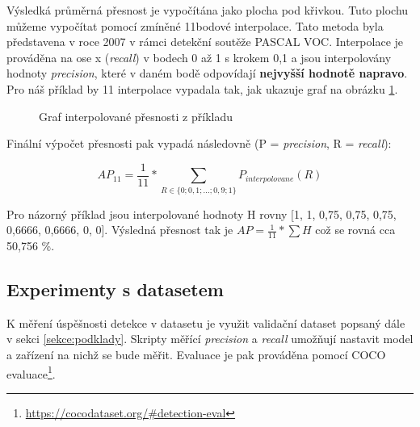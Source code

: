 Výsledká průměrná přesnost je vypočítána jako plocha pod křivkou. Tuto plochu můžeme vypočítat pomocí zmíněné 11bodové interpolace. Tato metoda byla představena v roce 2007 v rámci detekční soutěže PASCAL VOC. Interpolace je prováděna na ose x (\emph{recall}) v bodech 0 až 1 s krokem 0,1 a jsou interpolovány hodnoty \emph{precision}, které v daném bodě odpovídají \textbf{nejvyšší hodnotě napravo}. Pro náš příklad by 11 interpolace vypadala tak, jak ukazuje graf na obrázku \ref{obrazek:interpolace}.

\begin{figure}[H] 
  \begin{center}
  \label{obrazek:interpolace}
  \caption{Graf interpolované přesnosti z příkladu}
  \end{center}
\end{figure}

\noindent Finální výpočet přesnosti pak vypadá následovně \cite{interpolace, detekceMetriky} (P = \emph{precision}, R = \emph{recall}):

\begin{equation}
  AP_{11} = \frac{1}{11} * \sum_{R \in \{0;0,1;...;0,9;1\}} P_{interpolovane} (R)
\end{equation}

Pro názorný příklad jsou interpolované hodnoty H rovny [1, 1, 0,75, 0,75, 0,75, 0,6666, 0,6666, 0, 0]. Výsledná přesnost tak je $AP = \frac{1}{11} * \sum H$ což se rovná cca 50,756 \%.

\subsection*{Experimenty s datasetem}
K měření úspěšnosti detekce v datasetu je využit validační dataset popsaný dále v sekci \ref{sekce:podklady}. Skripty měřící \emph{precision} a \emph{recall} umožňují nastavit model a zařízení na nichž se bude měřit. Evaluace je pak prováděna pomocí COCO evaluace\footnote{\url{https://cocodataset.org/\#detection-eval}}. 

